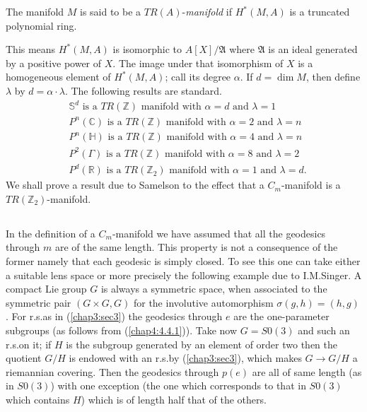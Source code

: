 \begin{defi*}
The manifold $M$ is said to be a $TR(A)$-{\em manifold} if
$H^{\ast}(M,A)$ is a truncated polynomial ring.
\end{defi*}

This means $H^{\ast}(M,A)$ is isomorphic to $A[X]/\mathfrak{A}$ where
$\mathfrak{A}$ is an ideal generated by a positive power of $X$. The
image under that isomorphism of $X$ is a homogeneous element of
$H^{\ast}(M,A)$; call its degree $\alpha$. If $d=\dim M$, then define
$\lambda$ by $d=\alpha\cdot \lambda$. The following results are
standard.
\begin{equation*}
\begin{split}
& \mathbb{S}^{d}\text{ is a } TR(\mathbb{Z})\text{ manifold with
  }\alpha=d\text{ and }\lambda=1\\
& P^{n}(\mathbb{C})\text{ is a } TR(\mathbb{Z})\text{  manifold with }
  \alpha=2 \text{ and } \lambda=n\\
& P^{n}(\mathbb{H})\text{ is a } TR(\mathbb{Z})\text{ manifold with }
  \alpha=4\text{ and }\lambda=n\\
& P^{2}(\Gamma)\text{ is a } TR(\mathbb{Z})\text{ manifold with
  }\alpha=8\text{ and } \lambda=2\\
& P^{d}(\mathbb{R})\text{ is a } TR(\mathbb{Z}_{2})\text{ manifold
    with } \alpha=1\text{ and }\lambda=d.
\end{split}\tag{4.6.3}\label{chap4:4.6.3}
\end{equation*}\pageoriginale
We shall prove a result due to Samelson to the effect that a
$C_{m}$-manifold is a $TR(\mathbb{Z}_{2})$-manifold.

\setcounter{subsection}{3}

\subsection{}\label{chap4:4.6.4}

\begin{remark*}
In the definition of a $C_{m}$-manifold we have assumed that all the
geodesics through $m$ are of the same length. This property is not a
consequence of the former namely that each geodesic is simply
closed. To see this one can take either a suitable lens space or more
precisely the following example due to I.M.\@ Singer. A compact Lie
group $G$ is always a symmetric space, when associated to the
symmetric pair $(G\times G,G)$ for the involutive automorphism
$\sigma(g,h)=(h,g)$. For r.s.\@ as in (\ref{chap3:sec3}) the geodesics
through $e$ are the one-parameter subgroups (as follows from
(\ref{chap4:4.4.1})). Take now $G=S0(3)$ and such an r.s.\@ on it; if
$H$ is the subgroup generated by an element of order two then the
quotient $G/H$ is endowed with an r.s.\@ by (\ref{chap3:sec3}), which makes
$G\to G/H$ a riemannian covering. Then the geodesics through $p(e)$
are all of same length (as in $S0(3)$) with one exception (the one
which corresponds to that in $S0(3)$ which contains $H$) which is of
length half that of the others.
\end{remark*}

